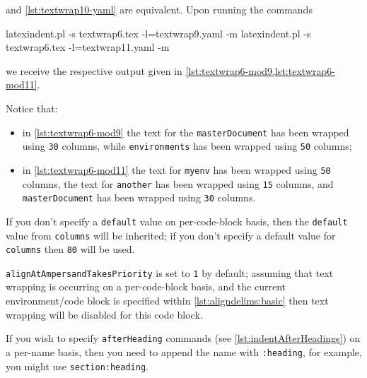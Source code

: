 	 and \cref{lst:textwrap10-yaml} are equivalent. Upon running
	the commands
	\begin{commandshell}
latexindent.pl -s textwrap6.tex -l=textwrap9.yaml -m
latexindent.pl -s textwrap6.tex -l=textwrap11.yaml -m
\end{commandshell}
	we receive the respective output given in \cref{lst:textwrap6-mod9,lst:textwrap6-mod11}.

	\begin{widepage}

	\end{widepage}

	Notice that:
	\begin{itemize}
		\item in \cref{lst:textwrap6-mod9} the text for the \texttt{masterDocument} has been
		      wrapped using \texttt{30} columns, while \texttt{environments} has
		      been wrapped using \texttt{50} columns;
		\item in \cref{lst:textwrap6-mod11} the text for \texttt{myenv} has been wrapped
		      using \texttt{50} columns, the text for \texttt{another} has
		      been wrapped using \texttt{15} columns, and \texttt{masterDocument}
		      has been wrapped using \texttt{30} columns.
	\end{itemize}
	If you don't specify a \texttt{default} value on per-code-block basis, then
	the \texttt{default} value from \texttt{columns} will be inherited;
	if you don't specify a default value for \texttt{columns} then
	\texttt{80} will be used.

	\texttt{alignAtAmpersandTakesPriority} is set to \texttt{1} by default; assuming
	that text wrapping is occurring on a per-code-block basis, and the current
	environment/code block is specified within \vref{lst:aligndelims:basic} then text wrapping
	will be disabled for this code block.

	If you wish to specify \texttt{afterHeading} commands (see
	\vref{lst:indentAfterHeadings}) on a per-name basis, then you need to append the name with
	\texttt{:heading}, for example, you might use \texttt{section:heading}.


